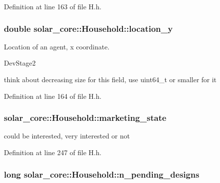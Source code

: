 Definition at line 163 of file H.\+h.

\hypertarget{classsolar__core_1_1_household_a1ba6b7af82982096e05d99a70a2647eb}{}
\subsubsection[{location\+\_\+y}]{\setlength{\rightskip}{0pt plus 5cm}double solar\+\_\+core\+::\+Household\+::location\+\_\+y}\label{classsolar__core_1_1_household_a1ba6b7af82982096e05d99a70a2647eb}
Location of an agent, x coordinate.\begin{DoxyRefDesc}{Dev\+Stage2}
\item[\hyperlink{_dev_stage2__DevStage2000010}{Dev\+Stage2}]think about decreasing size for this field, use uint64\+\_\+t or smaller for it \end{DoxyRefDesc}


Definition at line 164 of file H.\+h.

\hypertarget{classsolar__core_1_1_household_a3ee8b2654cad46236d11f85a4ccd9574}{}
\subsubsection[{marketing\+\_\+state}]{ solar\+\_\+core\+::\+Household\+::marketing\+\_\+state\hspace{0.3cm}{\ttfamily [protected]}}\label{classsolar__core_1_1_household_a3ee8b2654cad46236d11f85a4ccd9574}
could be interested, very interested or not 

Definition at line 247 of file H.\+h.

\hypertarget{classsolar__core_1_1_household_ac82a6ebca38ecaf971845f6fa5791559}{}
\subsubsection[{n\+\_\+pending\+\_\+designs}]{\setlength{\rightskip}{0pt plus 5cm}long solar\+\_\+core\+::\+Household\+::n\+\_\+pending\+\_\+designs\hspace{0.3cm}{\ttfamily [protected]}}\label{classsolar__core_1_1_household_ac82a6ebca38ecaf971845f6fa5791559}


